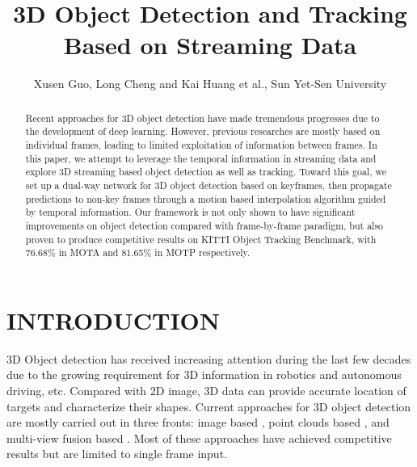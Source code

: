 \documentclass[letterpaper, 10pt, conference]{ieeeconf}  %
\title{\LARGE \bf
3D Object Detection and Tracking Based on Streaming Data
}
\author{Xusen Guo, Long Cheng and Kai Huang et al., Sun Yet-Sen University}
\begin{document}
\maketitle
\thispagestyle{empty}
\pagestyle{empty}


\begin{abstract}
Recent approaches for 3D object detection have made tremendous progresses due to the development of deep learning. However, previous researches are mostly based on individual frames, leading to limited exploitation of information between frames. In this paper, we attempt to leverage the temporal information in streaming data and explore 3D streaming based object detection as well as tracking. Toward this goal, we set up a dual-way network for 3D object detection based on keyframes, then propagate predictions to non-key frames through a motion based interpolation algorithm guided by temporal information. Our framework is not only shown to have significant improvements on object detection compared with frame-by-frame paradigm, but also proven to produce competitive results on KITTI Object Tracking Benchmark, with 76.68\% in MOTA and 81.65\% in MOTP respectively.


\end{abstract}

\section{INTRODUCTION}

3D Object detection has received increasing attention during the last few decades due to the growing requirement for 3D information in robotics and autonomous driving, etc. Compared with 2D image, 3D data can provide accurate location of targets and characterize their shapes. Current approaches for 3D object detection are mostly carried out in three fronts: image based \cite{7780605, chen20183d}, point clouds based \cite{zhou2018voxelnet,yang2018pixor,simon2018complex}, and multi-view fusion based \cite{chen2017multi,ku2018joint}. Most of these approaches have achieved competitive results but are limited to single frame input.
\end{document}
